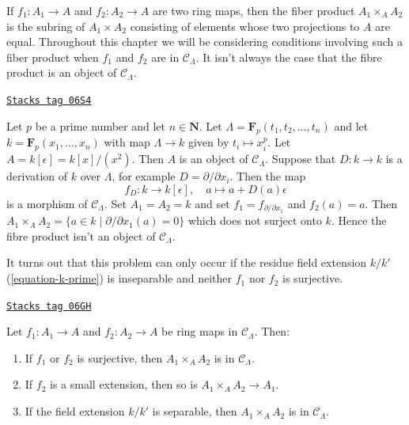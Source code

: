 If $f_1: A_1 \to A$ and $f_2: A_2 \to A$ are two ring maps, then the fiber
product $A_1 \times_A A_2$ is the subring of $A_1 \times A_2$ consisting of
elements whose two projections to $A$ are equal. Throughout this chapter we
will be considering conditions involving such a fiber product when $f_1$
and $f_2$ are in $\mathcal{C}_\Lambda$. It isn't always the case that the
fibre product is an object of $\mathcal{C}_\Lambda$.

\begin{example}
\label{formal-defos-example-fibre-product}
\href{https://stacks.math.columbia.edu/tag/06S4}{\texttt{Stacks tag 06S4}}

Let $p$ be a prime number and let $n \in \mathbf{N}$.
Let $\Lambda = \mathbf{F}_p(t_1, t_2, \ldots, t_n)$ and let
$k = \mathbf{F}_p(x_1, \ldots, x_n)$ with map $\Lambda \to k$ given
by $t_i \mapsto x_i^p$. Let $A = k[\epsilon] = k[x]/(x^2)$.
Then $A$ is an object of $\mathcal{C}_\Lambda$. Suppose that
$D : k \to k$ is a derivation of $k$ over $\Lambda$, for example
$D = \partial/\partial x_i$. Then the map
$$
f_D : k \longrightarrow k[\epsilon], \quad
a \mapsto a + D(a)\epsilon
$$
is a morphism of $\mathcal{C}_\Lambda$. Set $A_1 = A_2 = k$ and set
$f_1 = f_{\partial/\partial x_1}$ and $f_2(a) = a$. Then
$A_1 \times_A A_2 = \{a \in k \mid \partial/\partial x_1(a) = 0\}$
which does not surject onto $k$. Hence the fibre product isn't
an object of $\mathcal{C}_\Lambda$.
\end{example}

It turns out that this problem can only occur if the residue field
extension $k/k'$ (\ref{equation-k-prime}) is inseparable
and neither $f_1$ nor $f_2$ is surjective.

\begin{lemma}
\label{formal-defos-lemma-fiber-product-CLambda}
\href{https://stacks.math.columbia.edu/tag/06GH}{\texttt{Stacks tag 06GH}}

Let $f_1 : A_1 \to A$ and $f_2 : A_2 \to A$ be ring maps in
$\mathcal{C}_\Lambda$. Then:
\begin{enumerate}
\item If $f_1$ or $f_2$ is surjective, then
$A_1 \times_A A_2$ is in $\mathcal{C}_\Lambda$.
\item If $f_2$ is a small extension, then so is
$A_1 \times_A A_2 \to A_1$.
\item If the field extension $k/k'$ is separable, then
$A_1 \times_A A_2$ is in $\mathcal{C}_\Lambda$.
\end{enumerate}
\end{lemma}

